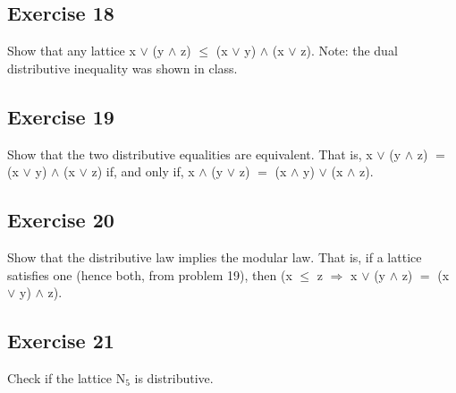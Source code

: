 \documentclass{article}
\newcommand{\mt}[1]{\ensuremath{#1}}
\newcommand\ssc[2][\DefaultOpt]{%
  \def\DefaultOpt{#2}%
  \subsection[#1]{#2}%
}
\newcommand{\rar}{ \mt{\Rightarrow} }     %
\newcommand{\lse}{\mt{\leq} }
\newcommand{\eql}{\mt{=} }
\newcommand{\uw}[2]{#1\mt{_{#2}}}
\newcommand{\lgnd}{\mt{\land} }
\newcommand{\lgor}{\mt{\lor} }
\begin{document}
\ssc{Exercise 18}{

Show that any lattice x \lgor (y \lgnd z) \lse (x \lgor y) \lgnd (x \lgor z). Note: the dual distributive inequality was shown in class.

}

\ssc{Exercise 19}{

Show that the two distributive equalities are equivalent. That is, x \lgor (y \lgnd z) \eql (x \lgor y) \lgnd (x \lgor z) if, and only if, x \lgnd (y \lgor z) \eql (x \lgnd y) \lgor (x \lgnd z).

}

\ssc{Exercise 20}{

Show that the distributive law implies the modular law. That is, if a lattice satisfies one (hence both, from problem 19), then (x \lse z \rar x \lgor (y \lgnd z) \eql (x \lgor y) \lgnd z).

}

\ssc{Exercise 21}{

Check if the lattice \uw{N}{5} is distributive.

}
\end{document}
